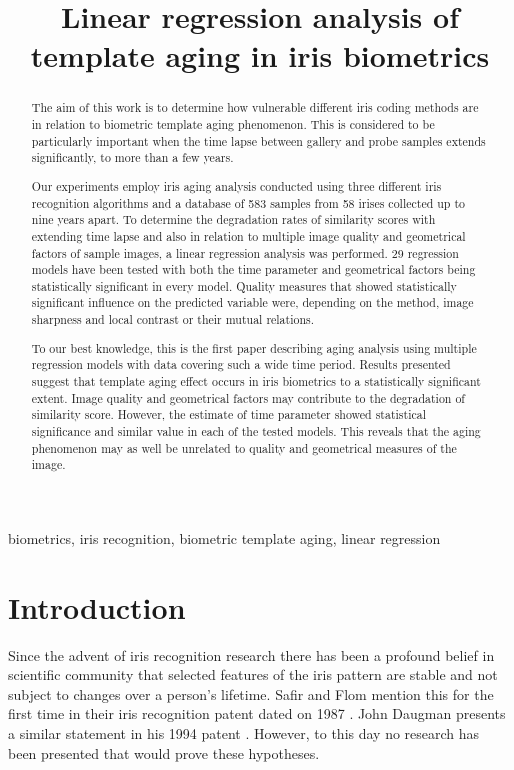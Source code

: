 \documentclass{article}
\title{Linear regression analysis of template aging in iris biometrics}
\begin{document}
%
\maketitle
%
\begin{abstract}
The aim of this work is to determine how vulnerable different iris coding methods are in relation to biometric template aging phenomenon. This is considered to be particularly important when the time lapse between gallery and probe samples extends significantly, to more than a few years.

Our experiments employ iris aging analysis conducted using three different iris recognition algorithms and a database of 583 samples from 58 irises collected up to nine years apart. To determine the degradation rates of similarity scores with extending time lapse and also in relation to multiple image quality and geometrical factors of sample images, a linear regression analysis was performed. 29 regression models have been tested with both the time parameter and geometrical factors being statistically significant in every model. Quality measures that showed statistically significant influence on the predicted variable were, depending on the method, image sharpness and local contrast or their mutual relations.

To our best knowledge, this is the first paper describing aging analysis using multiple regression models with data covering such a wide time period. Results presented suggest that template aging effect occurs in iris biometrics to a statistically significant extent. Image quality and geometrical factors may contribute to the degradation of similarity score. However, the estimate of time parameter showed statistical significance and similar value in each of the tested models. This reveals that the aging phenomenon may as well be unrelated to quality and geometrical measures of the image.

\end{abstract}
%
\begin{keywords}
biometrics, iris recognition, biometric template aging, linear regression
\end{keywords}
%
\section{Introduction}
\label{sec:intro}

Since the advent of iris recognition research there has been a profound belief in scientific community that selected features of the iris pattern are stable and not subject to changes over a person's lifetime. Safir and Flom mention this for the first time in their iris recognition patent dated on 1987 \cite{SafirFlom}. John Daugman presents a similar statement in his 1994 patent \cite{DaugmanPatent}. However, to this day no research has been presented that would prove these hypotheses.
\end{document}
